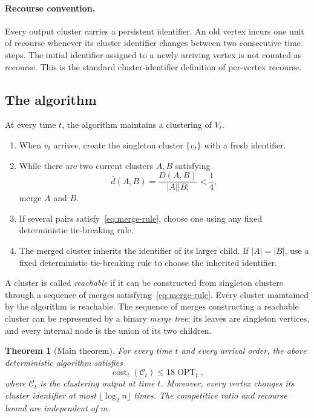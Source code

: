 \documentclass[11pt]{article}
\newtheorem{theorem}{Theorem}
\newcommand{\cost}{\operatorname{cost}}
\newcommand{\OPT}{\operatorname{OPT}}
\begin{document}
\paragraph{Recourse convention.}
Every output cluster carries a persistent identifier.  An old vertex incurs
one unit of recourse whenever its cluster identifier changes between two
consecutive time steps.  The initial identifier assigned to a newly arriving
vertex is not counted as recourse.  This is the standard cluster-identifier
definition of per-vertex recourse.

\subsection{The algorithm}

At every time $t$, the algorithm maintains a clustering of $V_t$.

\begin{enumerate}
 \item When $v_t$ arrives, create the singleton cluster $\{v_t\}$ with a
       fresh identifier.
 \item While there are two current clusters $A,B$ satisfying
       \begin{equation}
         \overline d(A,B)=\frac{D(A,B)}{|A||B|}<\frac14,
         \label{eq:merge-rule}
       \end{equation}
       merge $A$ and $B$.
 \item If several pairs satisfy~\eqref{eq:merge-rule}, choose one using any
       fixed deterministic tie-breaking rule.
 \item The merged cluster inherits the identifier of its larger child.  If
       $|A|=|B|$, use a fixed deterministic tie-breaking rule to choose the
       inherited identifier.
\end{enumerate}

A cluster is called \emph{reachable} if it can be constructed from singleton
clusters through a sequence of merges satisfying~\eqref{eq:merge-rule}.
Every cluster maintained by the algorithm is reachable.  The sequence of
merges constructing a reachable cluster can be represented by a binary
\emph{merge tree}: its leaves are singleton vertices, and every internal node
is the union of its two children.

\begin{theorem}[Main theorem]
For every time $t$ and every arrival order, the above deterministic algorithm
satisfies
\[
  \cost_t(\mathcal C_t)\le18\OPT_t,
\]
where $\mathcal C_t$ is the clustering output at time $t$.  Moreover, every
vertex changes its cluster identifier at most $\lfloor\log_2 n\rfloor$ times.
The competitive ratio and recourse bound are independent of $m$.
\end{theorem}
\end{document}
